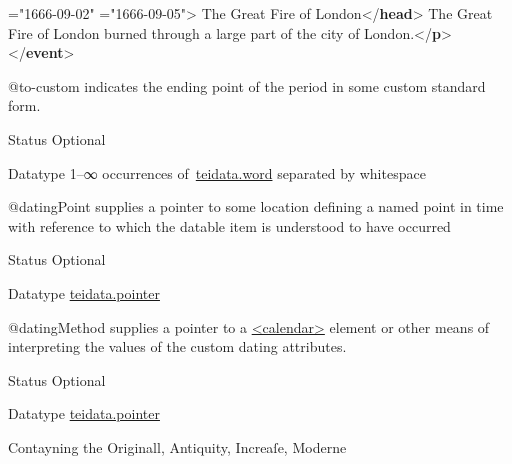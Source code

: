 \begin{reflist}
\begin{sansreflist}
\begin{reflist}
{\hspace*{1em}{from-custom}="{1666-09-02}"\mbox{}\newline 
\hspace*{1em}{to-custom}="{1666-09-05}">}\mbox{}\newline 
{}The Great Fire of London{</\textbf{head}>}\mbox{}\newline 
{}The Great Fire of London burned through a large part\mbox{}\newline 
\hspace*{1em}\hspace*{1em} of the city of London.{</\textbf{p}>}\mbox{}\newline 
{</\textbf{event}>}
\end{reflist}  
    \item[@to-custom]
  indicates the ending point of the period in some custom standard form.
\begin{reflist}
    \item[{Status}]
  Optional
    \item[{Datatype}]
  1–∞ occurrences of \hyperref[TEI.teidata.word]{teidata.word} separated by whitespace
\end{reflist}  
    \item[@datingPoint]
  supplies a pointer to some location defining a named point in time with reference to which the datable item is understood to have occurred
\begin{reflist}
    \item[{Status}]
  Optional
    \item[{Datatype}]
  \hyperref[TEI.teidata.pointer]{teidata.pointer}
\end{reflist}  
    \item[@datingMethod]
  supplies a pointer to a \hyperref[TEI.calendar]{<calendar>} element or other means of interpreting the values of the custom dating attributes.
\begin{reflist}
    \item[{Status}]
  Optional
    \item[{Datatype}]
  \hyperref[TEI.teidata.pointer]{teidata.pointer}
    \item[]\exampleFont Contayning the Originall, Antiquity, Increaſe, Moderne\mbox{}\newline 

\end{reflist}
\end{sansreflist}
\end{reflist}
